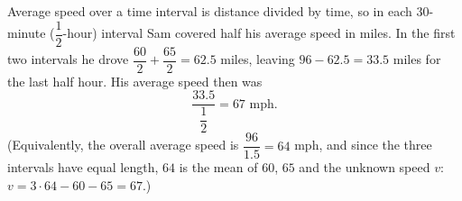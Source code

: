 Average speed over a time interval is distance divided by time, so in each $30$-minute ($\dfrac{1}{2}$-hour) interval Sam covered half his average speed in miles. In the first two intervals he drove $\dfrac{60}{2}+\dfrac{65}{2}=62.5$ miles, leaving $96-62.5=33.5$ miles for the last half hour. His average speed then was
\[
\dfrac{33.5}{\dfrac{1}{2}}=\boxed{67}\text{ mph}.
\]
(Equivalently, the overall average speed is $\dfrac{96}{1.5}=64$ mph, and since the three intervals have equal length, $64$ is the mean of $60$, $65$ and the unknown speed $v$: $v=3\cdot64-60-65=67$.)
